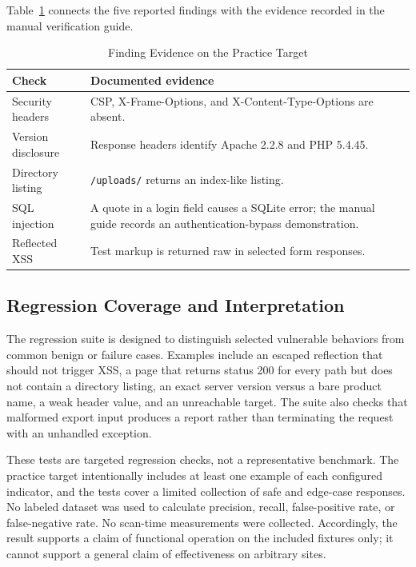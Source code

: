 \documentclass[conference]{IEEEtran}
\begin{document}
Table~\ref{tab:checks} connects the five reported findings with the evidence
recorded in the manual verification guide.
\begin{table}[!t]
\caption{Finding Evidence on the Practice Target}
\label{tab:checks}
\centering
\footnotesize
\begin{tabular}{|p{}|p{}|}
\hline
\textbf{Check} & \textbf{Documented evidence} \\
\hline
Security headers & CSP, X-Frame-Options, and X-Content-Type-Options are absent. \\
\hline
Version disclosure & Response headers identify Apache 2.2.8 and PHP 5.4.45. \\
\hline
Directory listing & \texttt{/uploads/} returns an index-like listing. \\
\hline
SQL injection & A quote in a login field causes a SQLite error; the manual guide records an authentication-bypass demonstration. \\
\hline
Reflected XSS & Test markup is returned raw in selected form responses. \\
\hline
\end{tabular}
\end{table}

\subsection{Regression Coverage and Interpretation}
The regression suite is designed to distinguish selected vulnerable behaviors
from common benign or failure cases. Examples include an escaped reflection
that should not trigger XSS, a page that returns status 200 for every path but
does not contain a directory listing, an exact server version versus a bare
product name, a weak header value, and an unreachable target. The suite also
checks that malformed export input produces a report rather than terminating
the request with an unhandled exception.

These tests are targeted regression checks, not a representative benchmark.
The practice target intentionally includes at least one example of each
configured indicator, and the tests cover a limited collection of safe and
edge-case responses. No labeled dataset was used to calculate precision,
recall, false-positive rate, or false-negative rate. No scan-time measurements
were collected. Accordingly, the result supports a claim of functional
operation on the included fixtures only; it cannot support a general claim of
effectiveness on arbitrary sites.
\end{document}
